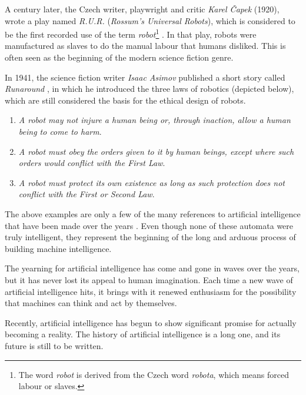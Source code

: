 A century later, the Czech writer, playwright and critic \textit{Karel Čapek} (1920), wrote a play named \textit{R.U.R.} (\textit{Rossum’s Universal Robots}), which is considered to be the first recorded use of the term \textit{robot}\footnote{The word \textit{robot} is derived from the Czech word \textit{robota}, which means forced labour or slaves.}  \autocite{nils2009}. In that play, robots were manufactured as slaves to do the manual labour that humans disliked. This is often seen as the beginning of the modern science fiction genre.

In 1941, the science fiction writer \textit{Isaac Asimov} published a short story called \textit{Runaround} \autocite{nils2009}, in which he introduced the three laws of robotics (depicted below), which are still considered the basis for the ethical design of robots.

\begin{enumerate}
	\item \textit{A robot may not injure a human being or, through inaction, allow a human being to come to harm}.
	\item \textit{A robot must obey the orders given to it by human beings, except where such orders would conflict with the First Law}.
	\item \textit{A robot must protect its own existence as long as such protection does not conflict with the First or Second Law}.
\end{enumerate}

The above examples are only a few of the many references to artificial intelligence that have been made over the years \autocite{nils2009}. Even though none of these automata were truly intelligent, they represent the beginning of the long and arduous process of building machine intelligence.  

The yearning for artificial intelligence has come and gone in waves over the years, but it has never lost its appeal to human imagination. Each time a new wave of artificial intelligence hits, it brings with it renewed enthusiasm for the possibility that machines can think and act by themselves. 

Recently, artificial intelligence has begun to show significant promise for actually becoming a reality. The history of artificial intelligence is a long one, and its future is still to be written.

